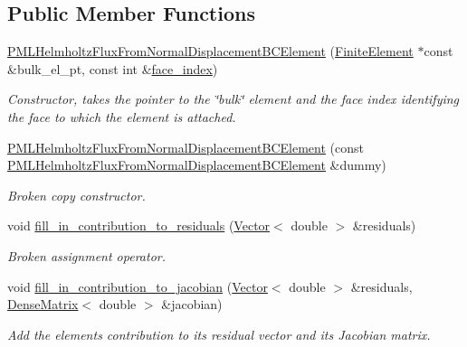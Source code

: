 \subsection*{Public Member Functions}
\begin{DoxyCompactItemize}
\item 
\hyperlink{classoomph_1_1PMLHelmholtzFluxFromNormalDisplacementBCElement_abd57422005608f9ddfccefa73e6d757c}{P\+M\+L\+Helmholtz\+Flux\+From\+Normal\+Displacement\+B\+C\+Element} (\hyperlink{classoomph_1_1FiniteElement}{Finite\+Element} $\ast$const \&bulk\+\_\+el\+\_\+pt, const int \&\hyperlink{classoomph_1_1FaceElement_a478d577ac6db67ecc80f1f02ae3ab170}{face\+\_\+index})
\begin{DoxyCompactList}\small\item\em Constructor, takes the pointer to the \char`\"{}bulk\char`\"{} element and the face index identifying the face to which the element is attached. \end{DoxyCompactList}\item 
\hyperlink{classoomph_1_1PMLHelmholtzFluxFromNormalDisplacementBCElement_a4eaae55dc9bd4d6076cf9f6f75f06df3}{P\+M\+L\+Helmholtz\+Flux\+From\+Normal\+Displacement\+B\+C\+Element} (const \hyperlink{classoomph_1_1PMLHelmholtzFluxFromNormalDisplacementBCElement}{P\+M\+L\+Helmholtz\+Flux\+From\+Normal\+Displacement\+B\+C\+Element} \&dummy)
\begin{DoxyCompactList}\small\item\em Broken copy constructor. \end{DoxyCompactList}\item 
void \hyperlink{classoomph_1_1PMLHelmholtzFluxFromNormalDisplacementBCElement_ab43c2c8e318060cf808329b1c147a333}{fill\+\_\+in\+\_\+contribution\+\_\+to\+\_\+residuals} (\hyperlink{classoomph_1_1Vector}{Vector}$<$ double $>$ \&residuals)
\begin{DoxyCompactList}\small\item\em Broken assignment operator. \end{DoxyCompactList}\item 
void \hyperlink{classoomph_1_1PMLHelmholtzFluxFromNormalDisplacementBCElement_a159c7c508fc565f7d70481cd467a5152}{fill\+\_\+in\+\_\+contribution\+\_\+to\+\_\+jacobian} (\hyperlink{classoomph_1_1Vector}{Vector}$<$ double $>$ \&residuals, \hyperlink{classoomph_1_1DenseMatrix}{Dense\+Matrix}$<$ double $>$ \&jacobian)
\begin{DoxyCompactList}\small\item\em Add the element\textquotesingle{}s contribution to its residual vector and its Jacobian matrix. \end{DoxyCompactList}\item 

\end{DoxyCompactItemize}
